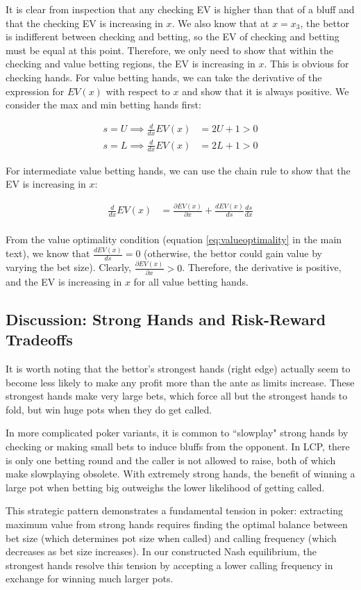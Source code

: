 \documentclass[../../main/main.tex]{subfiles}
\begin{document}
\begin{customproof}
    It is clear from inspection that any checking EV is higher than that of a bluff and that the checking EV is increasing in $x$. We also know that at $x=x_3$, the bettor is indifferent between checking and betting, so the EV of checking and betting must be equal at this point. Therefore, we only need to show that within the checking and value betting regions, the EV is increasing in $x$. This is obvious for checking hands. For value betting hands, we can take the derivative of the expression for $EV(x)$ with respect to $x$ and show that it is always positive. We consider the max and min betting hands first:

    \begin{align*}
        s = U \implies \frac{d}{dx} EV(x) & = 2U + 1 > 0  \\
        s = L \implies \frac{d}{dx} EV(x) & = 2L + 1 > 0
    \end{align*}

    For intermediate value betting hands, we can use the chain rule to show that the EV is increasing in $x$:

    \begin{align*}
        \frac{d}{dx} EV(x) & = \frac{\partial EV(x)}{\partial x} + \frac{dEV(x)}{ds} \frac{d s}{d x} \\
    \end{align*}

    From the value optimality condition (equation \ref{eq:valueoptimality} in the main text), we know that $\frac{dEV(x)}{ds} = 0$ (otherwise, the bettor could gain value by varying the bet size). Clearly, $\frac{\partial EV(x)}{\partial x} > 0$.  Therefore, the derivative is positive, and the EV is increasing in $x$ for all value betting hands.
\end{customproof}

\subsection{Discussion: Strong Hands and Risk-Reward Tradeoffs}

It is worth noting that the bettor's strongest hands (right edge) actually seem to become less likely to make any profit more than the ante as limits increase. These strongest hands make very large bets, which force all but the strongest hands to fold, but win huge pots when they do get called.

In more complicated poker variants, it is common to ``slowplay" strong hands by checking or making small bets to induce bluffs from the opponent. In LCP, there is only one betting round and the caller is not allowed to raise, both of which make slowplaying obsolete. With extremely strong hands, the benefit of winning a large pot when betting big outweighs the lower likelihood of getting called.

This strategic pattern demonstrates a fundamental tension in poker: extracting maximum value from strong hands requires finding the optimal balance between bet size (which determines pot size when called) and calling frequency (which decreases as bet size increases). In our constructed Nash equilibrium, the strongest hands resolve this tension by accepting a lower calling frequency in exchange for winning much larger pots.
\end{document}
